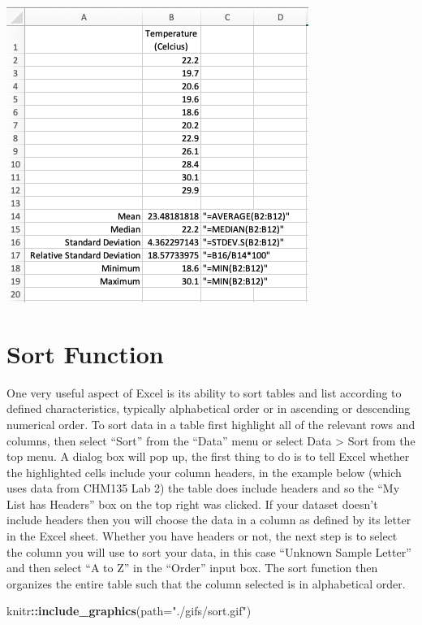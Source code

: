 \documentclass[
]{book}
\newenvironment{Shaded}{\begin{snugshade}}{\end{snugshade}}
\newcommand{\AttributeTok}[1]{\textcolor[rgb]{0.13,0.29,0.53}{#1}}
\newcommand{\FunctionTok}[1]{\textcolor[rgb]{0.13,0.29,0.53}{\textbf{#1}}}
\newcommand{\NormalTok}[1]{#1}
\newcommand{\SpecialCharTok}[1]{\textcolor[rgb]{0.81,0.36,0.00}{\textbf{#1}}}
\newcommand{\StringTok}[1]{\textcolor[rgb]{0.31,0.60,0.02}{#1}}
\begin{document}
\includegraphics{images/SimpleStats.png}

\hypertarget{sort-function}{%
\section{Sort Function}\label{sort-function}}

One very useful aspect of Excel is its ability to sort tables and list according to defined characteristics, typically alphabetical order or in ascending or descending numerical order. To sort data in a table first highlight all of the relevant rows and columns, then select ``Sort'' from the ``Data'' menu or select Data \textgreater{} Sort from the top menu. A dialog box will pop up, the first thing to do is to tell Excel whether the highlighted cells include your column headers, in the example below (which uses data from CHM135 Lab 2) the table does include headers and so the ``My List has Headers'' box on the top right was clicked. If your dataset doesn't include headers then you will choose the data in a column as defined by its letter in the Excel sheet. Whether you have headers or not, the next step is to select the column you will use to sort your data, in this case ``Unknown Sample Letter'' and then select ``A to Z'' in the ``Order'' input box. The sort function then organizes the entire table such that the column selected is in alphabetical order.

\begin{Shaded}
\begin{Highlighting}[]
\NormalTok{knitr}\SpecialCharTok{::}\FunctionTok{include\_graphics}\NormalTok{(}\AttributeTok{path=}\StringTok{"./gifs/sort.gif"}\NormalTok{)}
\end{Highlighting}
\end{Shaded}
\end{document}
